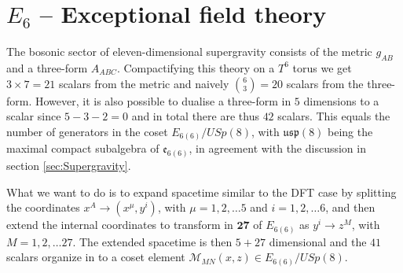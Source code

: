 \section{$E_6$ -- Exceptional field theory \label{sec:E6}}
The bosonic sector of eleven-dimensional supergravity consists of the metric $g_{AB}$ and a three-form $A_{ABC}$. Compactifying this theory on a $T^6$ torus we get $3\times 7=21$ scalars from the metric and naively ${{6}\choose{3}}=20$ scalars from the three-form. However, it is also possible to dualise a three-form in $5$ dimensions to a scalar since $5-3-2=0$ and in total there are thus $42$ scalars. This equals the number of generators in the coset $E_{6(6)}/USp(8)$, with $\mathfrak{usp}(8)$ being the maximal compact subalgebra of $\mathfrak{e}_{6(6)}$, in agreement with the discussion in section \ref{sec:Supergravity}. 

What we want to do is to expand spacetime similar to the DFT case by splitting the coordinates $x^A\to (x^\mu,y^i)$, with $\mu=1,2,\ldots 5$ and $i = 1,2,\ldots 6$, and then extend the internal coordinates to transform in $\mathbf{27}$ of $E_{6(6)}$ as $y^i\to z^M$, with $M=1,2,\ldots 27$. The extended spacetime is then $5+27$ dimensional and the $41$ scalars organize in to a coset element $\mathcal{M}_{MN}(x,z)\in E_{6(6)}/USp(8)$. 


